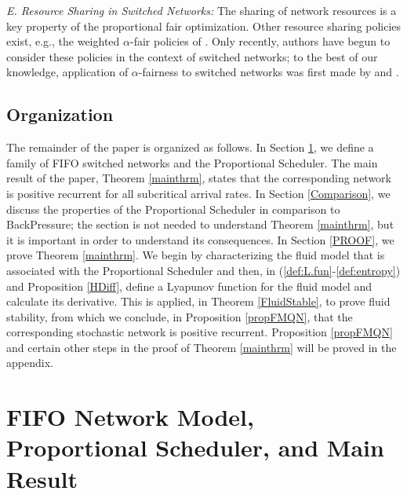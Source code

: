 \documentclass{amsart}
\begin{document}
\emph{E. Resource Sharing in Switched Networks:}
The sharing of network resources is a key property of the proportional fair optimization. Other resource sharing policies exist, e.g., the weighted $\alpha$-fair policies of \cite{MoWa00}.  Only recently, authors have begun to consider these policies in the context of switched networks; 
to the best of our knowledge, application of $\alpha$-fairness to switched networks was first made by \cite{ShWi11} and \cite{Zh12}. 

\iffalse
In recent years, there has been much progress on the analysis of decentralized throughput optimal algorithms for switched networks. 
In particular, see \cite{JiWa10} and \cite{ShSh12}, where
the proofs are given for single hop networks.  When the components of networks communicate, as in the present paper, further analysis is needed. We hope that the work here will be helpful in extensions from the single hop setting to multihop networks in analyzing networks of communicating components.
\fi

\subsection{Organization} 
The remainder of the paper is organized as follows. In  Section \ref{Model}, we define a family of FIFO switched networks and the Proportional Scheduler. The
main result of the paper, Theorem \ref{mainthrm}, states that the
corresponding network is positive recurrent for all subcritical arrival rates. In Section \ref{Comparison}, we discuss the properties of the Proportional Scheduler in comparison to BackPressure; the
section is not needed to understand Theorem \ref{mainthrm}, but it is important in order to understand its consequences.  
In Section \ref{PROOF}, we prove Theorem \ref{mainthrm}.  We begin by characterizing
the fluid model that is associated with the Proportional Scheduler and then,  in (\ref{def:L.fun}-\ref{def:entropy}) and Proposition \ref{HDiff}, define a Lyapunov function for the fluid model and calculate its derivative.    This is applied, in Theorem \ref{FluidStable}, to prove fluid stability,  from which we conclude, in Proposition \ref{propFMQN}, that the corresponding
stochastic network is positive recurrent.  Proposition \ref{propFMQN} and certain other steps in the proof of Theorem \ref{mainthrm} will be proved in the appendix.

\section{FIFO Network Model, Proportional Scheduler, and Main Result}\label{Model}
\end{document}

